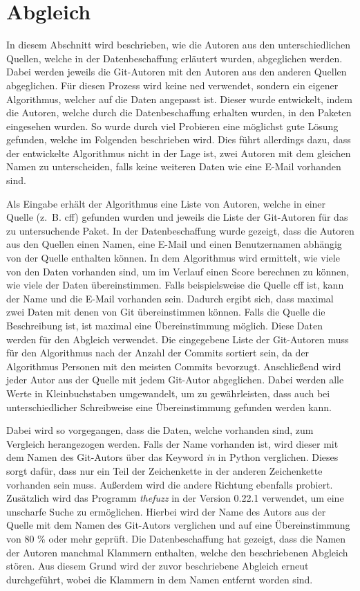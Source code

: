 \section{Abgleich}
\label{sec:abgleich}
In diesem Abschnitt wird beschrieben, wie die Autoren aus den unterschiedlichen Quellen, welche in der Datenbeschaffung erläutert wurden, abgeglichen werden.
Dabei werden jeweils die Git-Autoren mit den Autoren aus den anderen Quellen abgeglichen.
Für diesen Prozess wird keine \gls{ned} verwendet, sondern ein eigener Algorithmus, welcher auf die Daten angepasst ist.
Dieser wurde entwickelt, indem die Autoren, welche durch die Datenbeschaffung erhalten wurden, in den Paketen eingesehen wurden.
So wurde durch viel Probieren eine möglichst gute Lösung gefunden, welche im Folgenden beschrieben wird.
Dies führt allerdings dazu, dass der entwickelte Algorithmus nicht in der Lage ist, zwei Autoren mit dem gleichen Namen zu unterscheiden, falls keine weiteren Daten wie eine E-Mail vorhanden sind.

Als Eingabe erhält der Algorithmus eine Liste von Autoren, welche in einer Quelle (z. B. \gls{cff}) gefunden wurden und jeweils die Liste der Git-Autoren für das zu untersuchende Paket.
In der Datenbeschaffung wurde gezeigt, dass die Autoren aus den Quellen einen Namen, eine E-Mail und einen Benutzernamen abhängig von der Quelle enthalten können.
In dem Algorithmus wird ermittelt, wie viele von den Daten vorhanden sind, um im Verlauf einen Score berechnen zu können, wie viele der Daten übereinstimmen.
Falls beispielsweise die Quelle \gls{cff} ist, kann der Name und die E-Mail vorhanden sein.
Dadurch ergibt sich, dass maximal zwei Daten mit denen von Git übereinstimmen können.
Falls die Quelle die Beschreibung ist, ist maximal eine Übereinstimmung möglich.
Diese Daten werden für den Abgleich verwendet.
Die eingegebene Liste der Git-Autoren muss für den Algorithmus nach der Anzahl der Commits sortiert sein, da der Algorithmus Personen mit den meisten Commits bevorzugt.
Anschließend wird jeder Autor aus der Quelle mit jedem Git-Autor abgeglichen.
Dabei werden alle Werte in Kleinbuchstaben umgewandelt, um zu gewährleisten, dass auch bei unterschiedlicher Schreibweise eine Übereinstimmung gefunden werden kann.

Dabei wird so vorgegangen, dass die Daten, welche vorhanden sind, zum Vergleich herangezogen werden.
Falls der Name vorhanden ist, wird dieser mit dem Namen des Git-Autors über das Keyword \emph{in} in Python verglichen.
Dieses sorgt dafür, dass nur ein Teil der Zeichenkette in der anderen Zeichenkette vorhanden sein muss.
Außerdem wird die andere Richtung ebenfalls probiert.
Zusätzlich wird das Programm \emph{thefuzz} in der Version 0.22.1 verwendet, um eine unscharfe Suche zu ermöglichen.
Hierbei wird der Name des Autors aus der Quelle mit dem Namen des Git-Autors verglichen und auf eine Übereinstimmung von 80 \% oder mehr geprüft.
Die Datenbeschaffung hat gezeigt, dass die Namen der Autoren manchmal Klammern enthalten, welche den beschriebenen Abgleich stören.
Aus diesem Grund wird der zuvor beschriebene Abgleich erneut durchgeführt, wobei die Klammern in dem Namen entfernt worden sind.

